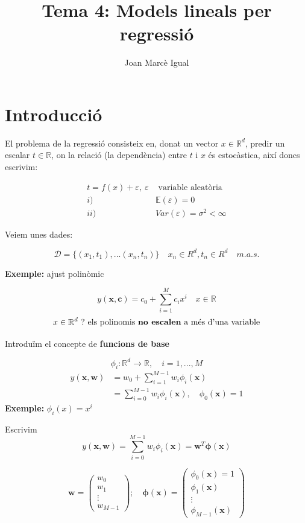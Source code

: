 \documentclass[a4paper]{article}
\title{Tema 4: Models lineals per regressió}
\author{Joan Marcè Igual}
\begin{document}
\maketitle

\section{Introducció}
El problema de la regressió consisteix en, donat un vector $x \in \mathbb{R}^d$, predir un escalar $t \in \mathbb{R}$, on la relació (la dependència) entre $t$ i $x$ és estocàstica, així doncs escrivim:


\begin{align*}
t = f(x) + \varepsilon,\ \varepsilon &\text{ variable aleatòria} \\
i) \quad &\mathbb{E}(\varepsilon) = 0 \\
ii)\quad & Var(\varepsilon) = \sigma^2 < \infty
\end{align*}

Veiem unes dades:

$$
\mathcal{D} = \{ (x_1, t_1), ... (x_n, t_n)  \} \quad x_n \in R^d, t_n \in R^d \quad m.a.s.
$$

\textbf{Exemple:} ajust polinòmic

$$
y(\boldsymbol{x}, \boldsymbol{c}) = c_0 + \sum_{i=1}^M c_i x^i \quad x \in \mathbb{R}
$$
$$
x \in \mathbb{R}^d\ ? \text{ els polinomis \textbf{no escalen} a més d'una variable}
$$

Introduïm el concepte de \textbf{funcions de base}

$$
\phi_i: \mathbb{R}^d \rightarrow \mathbb{R}, \quad i = 1,...,M
$$
\begin{align*}
y(\textbf{x}, \boldsymbol{w}) &= w_0 + \sum_{i=1}^{M-1} w_i \phi_i (\textbf{x}) \\
&=  \sum_{i=0}^{M-1} w_i \phi_i (\boldsymbol{x}), \quad \phi_0 (\boldsymbol{x}) = 1
\end{align*}
\textbf{Exemple:} $\phi_i (x) = x^i$

Escrivim
$$
y(\boldsymbol{x}, \boldsymbol{w}) = \sum_{i=0}^{M-1} w_i \phi_i (\boldsymbol{x}) = \boldsymbol{w}^T \boldsymbol{\phi} (\boldsymbol{x})
$$

$$
\boldsymbol{w} = 
\begin{pmatrix}
w_0 \\ w_1 \\ \vdots \\ w_{M-1}
\end{pmatrix};\quad
\boldsymbol{\phi}(\boldsymbol{x}) = 
\begin{pmatrix}
\phi_0 (\boldsymbol{x}) = 1 \\
\phi_1 (\boldsymbol{x}) \\
\vdots \\
\phi_{M-1} (\boldsymbol{x})
\end{pmatrix}
$$
\end{document}
